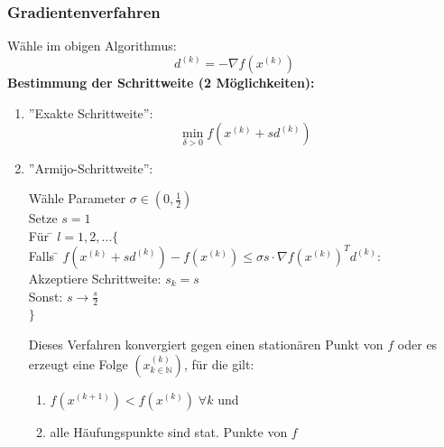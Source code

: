 \documentclass[a4paper,twocolumn,10pt]{article}
\begin{document}
\subsubsection{Gradientenverfahren}
Wähle im obigen Algorithmus:
\begin{equation*}
d^{(k)}=-\nabla f\left(x^{(k)}\right)
\end{equation*}
\textbf{Bestimmung der Schrittweite (2 Möglichkeiten):}
\begin{enumerate}
\item ''Exakte Schrittweite'':
\begin{equation*}
\min\limits_{\delta>0}f\left(x^{(k)}+sd^{(k)}\right)
\end{equation*}
\item ''Armijo-Schrittweite'':\\
\begin{tabbing}
Wähle Parameter $\sigma\in\left(0,\frac{1}{2}\right)$\\
Setze $s=1$\\
Für \= $l=1,2,...\{$\\
\> Falls \= $f\left(x^{(k)}+sd^{(k)}\right)-f\left(x^{(k)}\right) \leq\sigma s\cdot \nabla f\left(x^{(k)}\right)^Td^{(k)}$:\\
\>\> Akzeptiere Schrittweite: $s_k=s$\\
\> Sonst: $s\rightarrow \frac{s}{2}$\\
$\}$
\end{tabbing}
\vspace{0.2cm}
Dieses Verfahren konvergiert gegen einen stationären Punkt von $f$ oder es erzeugt eine Folge $\left(x^{(k)}_{k\in\mathbb{N}}\right)$, für die gilt:
\begin{enumerate}[label=$\bullet$]
\item $f\left(x^{(k+1)}\right)<f\left(x^{(k)}\right)\;\forall k$ und
\item alle Häufungspunkte sind stat. Punkte von $f$
\end{enumerate}
\end{enumerate}
\end{document}
